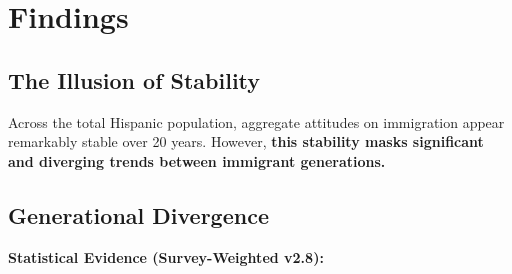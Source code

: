 \documentclass[11pt,letterpaper]{article}
\begin{document}
\section{Findings}

\subsection{The Illusion of Stability}

Across the total Hispanic population, aggregate attitudes on immigration appear remarkably stable over 20 years. However, \textbf{this stability masks significant and diverging trends between immigrant generations.}

\subsection{Generational Divergence}

\textbf{Statistical Evidence (Survey-Weighted v2.8):}
\end{document}
